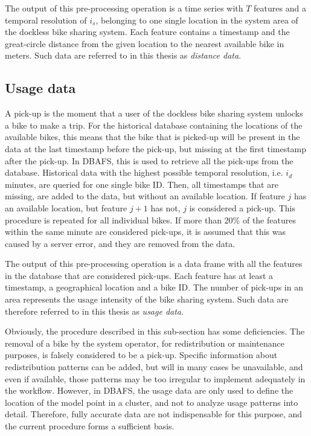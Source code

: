 \documentclass[12pt,oneside]{reedthesis}
\begin{document}
The output of this pre-processing operation is a time series with \(T\)
features and a temporal resolution of \(i_{s}\), belonging to one single
location in the system area of the dockless bike sharing system. Each
feature contains a timestamp and the great-circle distance from the
given location to the nearest available bike in meters. Such data are
referred to in this thesis as \emph{distance data}.

\subsection{Usage data}\label{usage-data}

A pick-up is the moment that a user of the dockless bike sharing system
unlocks a bike to make a trip. For the historical database containing
the locations of the available bikes, this means that the bike that is
picked-up will be present in the data at the last timestamp before the
pick-up, but missing at the first timestamp after the pick-up. In DBAFS,
this is used to retrieve all the pick-ups from the database. Historical
data with the highest possible temporal resolution, i.e. \(i_{d}\)
minutes, are queried for one single bike ID. Then, all timestamps that
are missing, are added to the data, but without an available location.
If feature \(j\) has an available location, but feature \(j+1\) has not,
\(j\) is considered a pick-up. This procedure is repeated for all
individual bikes. If more than 20\% of the features within the same
minute are considered pick-ups, it is assumed that this was caused by a
server error, and they are removed from the data.

The output of this pre-processing operation is a data frame with all the
features in the database that are considered pick-ups. Each feature has
at least a timestamp, a geographical location and a bike ID. The number
of pick-ups in an area represents the usage intensity of the bike
sharing system. Such data are therefore referred to in this thesis as
\emph{usage data}.

Obviously, the procedure described in this sub-section has some
deficiencies. The removal of a bike by the system operator, for
redistribution or maintenance purposes, is falsely considered to be a
pick-up. Specific information about redistribution patterns can be
added, but will in many cases be unavailable, and even if available,
those patterns may be too irregular to implement adequately in the
workflow. However, in DBAFS, the usage data are only used to define the
location of the model point in a cluster, and not to analyze usage
patterns into detail. Therefore, fully accurate data are not
indispensable for this purpose, and the current procedure forms a
sufficient basis.
\end{document}
